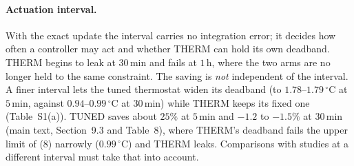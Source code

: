 \documentclass[11pt]{article}
\begin{document}
\paragraph{Actuation interval.} With the exact update the interval carries no
integration error; it decides how often a controller may act and whether THERM can hold its own deadband. THERM begins to leak at $30\,$min and fails at $1\,$h, where the two arms are no longer held to the same constraint. The saving is \emph{not} independent of the interval. A finer interval lets the tuned thermostat widen its deadband (to $1.78$--$1.79\,^\circ$C at $5\,$min, against $0.94$--$0.99\,^\circ$C at $30\,$min) while THERM keeps its fixed one (Table~S1(a)). TUNED saves about $25\%$ at $5\,$min and $-1.2$ to $-1.5\%$ at $30\,$min (main text, Section~9.3 and Table~8), where THERM's deadband fails the upper limit of (8) narrowly ($0.99\,^\circ$C) and THERM leaks. Comparisons with studies at a different interval must take that into account.
\end{document}
